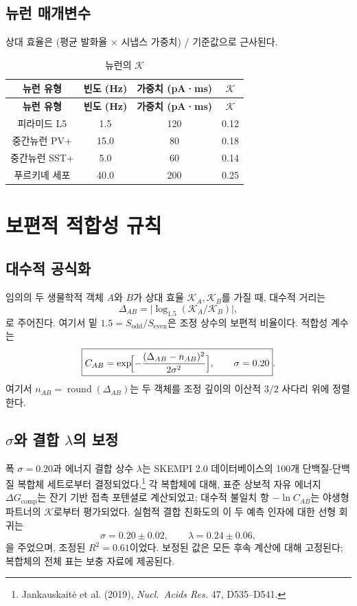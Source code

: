 \documentclass[12pt,a4paper]{article}
\newcommand{\REL}{\mathcal{K}}          %
\begin{document}
	\subsection{뉴런 매개변수}
	\label{sec:neural}
	상대 효율은 (평균 발화율 × 시냅스 가중치) / 기준값으로 근사된다.
	
	\begin{longtable}{|c|c|c|c|}
		\caption{뉴런의 \(\REL\)}\label{tab:neural}\\
		\hline
		\textbf{뉴런 유형} & \textbf{빈도 (Hz)} & \textbf{가중치 (pA·ms)} & \(\REL\) \\
		\hline
		\endfirsthead
		\hline
		\textbf{뉴런 유형} & \textbf{빈도 (Hz)} & \textbf{가중치 (pA·ms)} & \(\REL\) \\
		\hline
		\endhead
		\hline
		피라미드 L5 & 1.5 & 120 & 0.12 \\
		중간뉴런 PV+ & 15.0 & 80 & 0.18 \\
		중간뉴런 SST+ & 5.0 & 60 & 0.14 \\
		푸르키녜 세포 & 40.0 & 200 & 0.25 \\
		\hline
	\end{longtable}
	
	\section{보편적 적합성 규칙}
	\label{sec:compatibility}
	
	\subsection{대수적 공식화}
	임의의 두 생물학적 객체 \(A\)와 \(B\)가 상대 효율 \(\REL_A,\REL_B\)를 가질 때, 대수적 거리는
	\[
	\Delta_{AB} = \bigl|\log_{1.5}(\REL_A/\REL_B)\bigr|,
	\]
	로 주어진다. 여기서 밑 \(1.5 = S_{\mathrm{odd}}/S_{\mathrm{even}}\)은 조정 상수의 보편적 비율이다. 적합성 계수는
	\begin{equation}
		\boxed{C_{AB} = \exp\!\Bigl[-\frac{(\Delta_{AB}-n_{AB})^2}{2\sigma^2}\Bigr],\qquad \sigma = 0.20}.
		\label{eq:Cab}
	\end{equation}
	여기서 \(n_{AB} = \operatorname{round}(\Delta_{AB})\)는 두 객체를 조정 깊이의 이산적 \(3/2\) 사다리 위에 정렬한다.
	
	\subsection{\(\sigma\)와 결합 \(\lambda\)의 보정}
	폭 \(\sigma = 0.20\)과 에너지 결합 상수 \(\lambda\)는 SKEMPI 2.0 데이터베이스의 100개 단백질-단백질 복합체 세트로부터 결정되었다.\footnote{Jankauskaitė et al. (2019), \emph{Nucl.\ Acids Res.} 47, D535–D541.} 각 복합체에 대해, 표준 상보적 자유 에너지 \(\Delta G_{\mathrm{comp}}\)는 잔기 기반 접촉 포텐셜로 계산되었고; 대수적 불일치 항 \(-\ln C_{AB}\)는 야생형 파트너의 \(\REL\)로부터 평가되었다. 실험적 결합 친화도의 이 두 예측 인자에 대한 선형 회귀는
	\[
	\sigma = 0.20 \pm 0.02,\qquad \lambda = 0.24 \pm 0.06,
	\]
	을 주었으며, 조정된 \(R^2 = 0.61\)이었다.
	보정된 값은 모든 후속 계산에 대해 고정된다; 복합체의 전체 표는 보충 자료에 제공된다.
	
\end{document}
